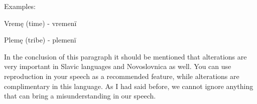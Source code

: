Examples:

Vremę (time) \textipa{[‘vrEmj\~E]} - vremenï 

Plemę (tribe) \textipa{[‘plEmj\~E]} - plemenï 


In the conclusion of this paragraph it should be mentioned that alterations are very important in Slavic languages and Novoslovnica as well. You can use reproduction in your speech as a recommended feature, while alterations are complimentary in this language. As I had said before, we cannot ignore anything that can bring a misunderstanding in our speech. 
